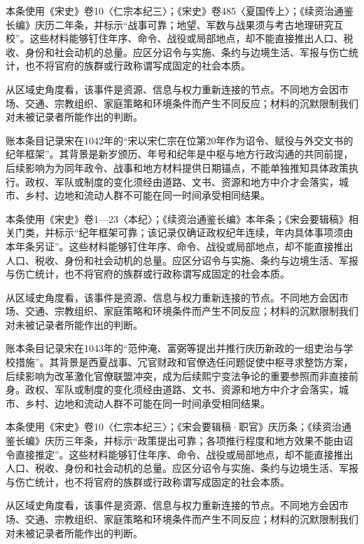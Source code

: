 本条使用《宋史》卷10〈仁宗本纪三〉；《宋史》卷485〈夏国传上〉；《续资治通鉴长编》庆历二年条，并标示“战事可靠；地望、军数与战果须与考古地理研究互校”。这些材料能够钉住年序、命令、战役或局部地点，却不能直接推出人口、税收、身份和社会动机的总量。应区分诏令与实施、条约与边境生活、军报与伤亡统计，也不将官府的族群或行政称谓写成固定的社会本质。

从区域史角度看，该事件是资源、信息与权力重新连接的节点。不同地方会因市场、交通、宗教组织、家庭策略和环境条件而产生不同反应；材料的沉默限制我们对未被记录者所能作出的判断。

账本条目记录宋在1042年的“宋以宋仁宗在位第20年作为诏令、赋役与外交文书的纪年框架”。其背景是新岁颁历、年号和纪年是中枢与地方行政沟通的共同前提，后续影响为为同年政令、战事和地方材料提供日期锚点，不能单独推知具体政策执行。政权、军队或制度的变化须经由道路、文书、资源和地方中介才会落实，城市、乡村、边地和流动人群不可能在同一时间承受相同结果。

本条使用《宋史》卷1—23〈本纪〉；《续资治通鉴长编》本年条；《宋会要辑稿》相关门类，并标示“纪年框架可靠；该记录仅确证政权纪年连续，年内具体事项须由本年条另证”。这些材料能够钉住年序、命令、战役或局部地点，却不能直接推出人口、税收、身份和社会动机的总量。应区分诏令与实施、条约与边境生活、军报与伤亡统计，也不将官府的族群或行政称谓写成固定的社会本质。

从区域史角度看，该事件是资源、信息与权力重新连接的节点。不同地方会因市场、交通、宗教组织、家庭策略和环境条件而产生不同反应；材料的沉默限制我们对未被记录者所能作出的判断。

账本条目记录宋在1043年的“范仲淹、富弼等提出并推行庆历新政的一组吏治与学校措施”。其背景是西夏战事、冗官财政和官僚选任问题促使中枢寻求整饬方案，后续影响为改革激化官僚联盟冲突，成为后续熙宁变法争论的重要参照而非直接前身。政权、军队或制度的变化须经由道路、文书、资源和地方中介才会落实，城市、乡村、边地和流动人群不可能在同一时间承受相同结果。

本条使用《宋史》卷10〈仁宗本纪三〉；《宋会要辑稿·职官》庆历条；《续资治通鉴长编》庆历三年条，并标示“政策提出可靠；各项推行程度和地方效果不能由诏令直接推定”。这些材料能够钉住年序、命令、战役或局部地点，却不能直接推出人口、税收、身份和社会动机的总量。应区分诏令与实施、条约与边境生活、军报与伤亡统计，也不将官府的族群或行政称谓写成固定的社会本质。

从区域史角度看，该事件是资源、信息与权力重新连接的节点。不同地方会因市场、交通、宗教组织、家庭策略和环境条件而产生不同反应；材料的沉默限制我们对未被记录者所能作出的判断。

